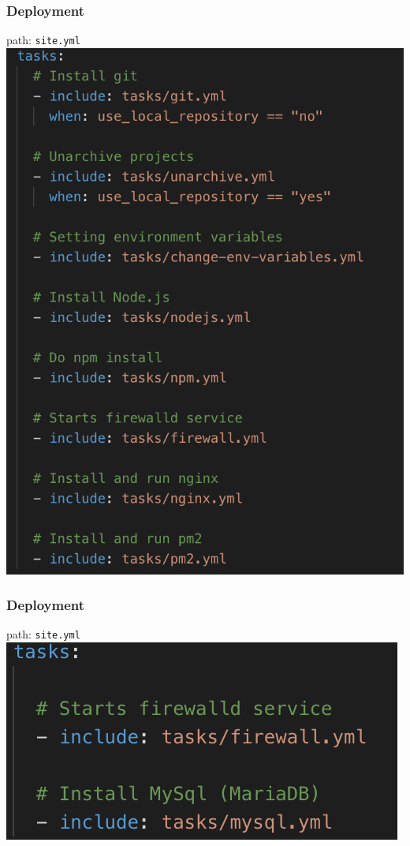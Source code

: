 \documentclass[12pt]{beamer}
\begin{document}
    \begin{frame}
		\frametitle{Deployment}
        path: \texttt{site.yml}
        \newline
   		\includegraphics[scale=.30]{assets/deploy_webserver.png}
    \end{frame}
        
    \begin{frame}
		\frametitle{Deployment}
        path: \texttt{site.yml}
        \newline
   		\includegraphics[scale=.30]{assets/deploy_databaseserver.png}
	\end{frame}
\end{document}

